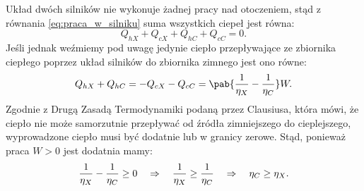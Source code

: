 Układ dwóch silników nie wykonuje żadnej pracy nad otoczeniem, stąd z równania \eqref{eq:praca_w_silniku} suma wszystkich ciepeł jest równa:
\begin{equation}
	Q_{hX} + Q_{cX} + Q_{hC} + Q_{cC} = 0.
\end{equation}
Jeśli jednak weźmiemy pod uwagę jedynie ciepło przepływające ze zbiornika ciepłego poprzez układ silników do zbiornika zimnego jest ono równe:
\begin{equation}
	Q_{hX} + Q_{hC} = - Q_{cX} - Q_{cC} = \pab{\inv{\eta_X} - \inv{\eta_C}}W.
\end{equation}
Zgodnie z Drugą Zasadą Termodynamiki podaną przez Clausiusa, która mówi, że ciepło nie może samorzutnie przepływać od źródła zimniejszego do cieplejszego, wyprowadzone ciepło musi być dodatnie lub w granicy zerowe. Stąd, ponieważ praca \(W > 0\) jest dodatnia mamy:
\begin{equation}
	\frac{1}{\eta_X} - \frac{1}{\eta_C} \geq 0 \quad\Rightarrow\quad
	\frac{1}{\eta_X} \geq \frac{1}{\eta_C} \quad\Rightarrow\quad
	\eta_C \geq \eta_X.
\end{equation}

